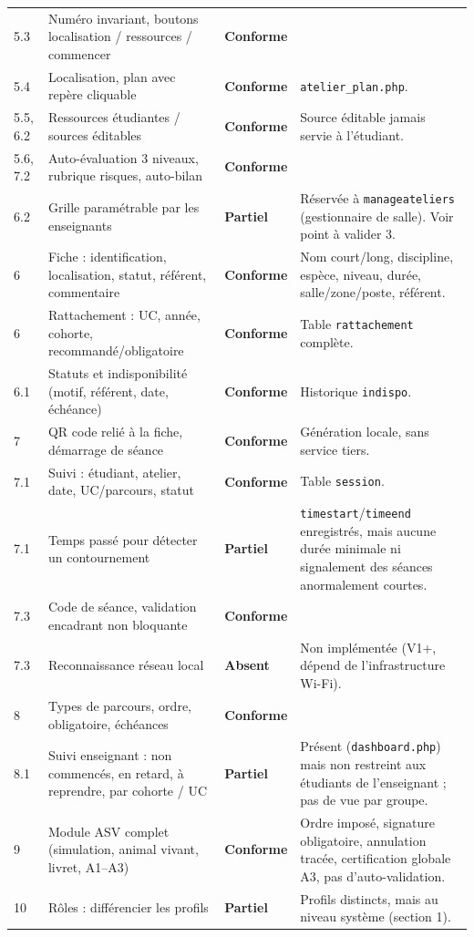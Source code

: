 \documentclass[11pt,a4paper]{article}
\newcommand{\OK}{\textcolor{ok}{\textbf{Conforme}}}
\newcommand{\PART}{\textcolor{part}{\textbf{Partiel}}}
\newcommand{\KO}{\textcolor{ko}{\textbf{Absent}}}
\newcommand{\code}[1]{\texttt{\small #1}}
\begin{document}
\begin{longtable}{>{\raggedright}p{1.3cm}>{\raggedright}p{4.2cm}p{1.95cm}>{\raggedright\arraybackslash}p{7.05cm}}
5.3 & Numéro invariant, boutons localisation / ressources / commencer & \OK & \\
5.4 & Localisation, plan avec repère cliquable & \OK & \code{atelier\_plan.php}. \\
5.5, 6.2 & Ressources étudiantes / sources éditables & \OK & Source éditable jamais servie
à l'étudiant. \\
5.6, 7.2 & Auto-évaluation 3 niveaux, rubrique risques, auto-bilan & \OK & \\
6.2 & Grille paramétrable par les enseignants & \PART & Réservée à
\code{manageateliers} (gestionnaire de salle). Voir point à valider 3. \\
6 & Fiche : identification, localisation, statut, référent, commentaire & \OK & Nom
court/long, discipline, espèce, niveau, durée, salle/zone/poste, référent. \\
6 & Rattachement : UC, année, cohorte, recommandé/obligatoire & \OK & Table
\code{rattachement} complète. \\
6.1 & Statuts et indisponibilité (motif, référent, date, échéance) & \OK & Historique
\code{indispo}. \\
7 & QR code relié à la fiche, démarrage de séance & \OK & Génération locale, sans service
tiers. \\
7.1 & Suivi : étudiant, atelier, date, UC/parcours, statut & \OK & Table \code{session}. \\
7.1 & Temps passé pour détecter un contournement & \PART & \code{timestart}/\code{timeend}
enregistrés, mais aucune durée minimale ni signalement des séances anormalement courtes. \\
7.3 & Code de séance, validation encadrant non bloquante & \OK & \\
7.3 & Reconnaissance réseau local & \KO & Non implémentée (V1+, dépend de l'infrastructure
Wi-Fi). \\
8 & Types de parcours, ordre, obligatoire, échéances & \OK & \\
8.1 & Suivi enseignant : non commencés, en retard, à reprendre, par cohorte / UC & \PART &
Présent (\code{dashboard.php}) mais non restreint aux étudiants de l'enseignant ; pas de
vue par groupe. \\
9 & Module ASV complet (simulation, animal vivant, livret, A1--A3) & \OK & Ordre imposé,
signature obligatoire, annulation tracée, certification globale A3, pas
d'auto-validation. \\
10 & Rôles : différencier les profils & \PART & Profils distincts, mais au niveau système
(section 1). \\

\end{longtable}
\end{document}
